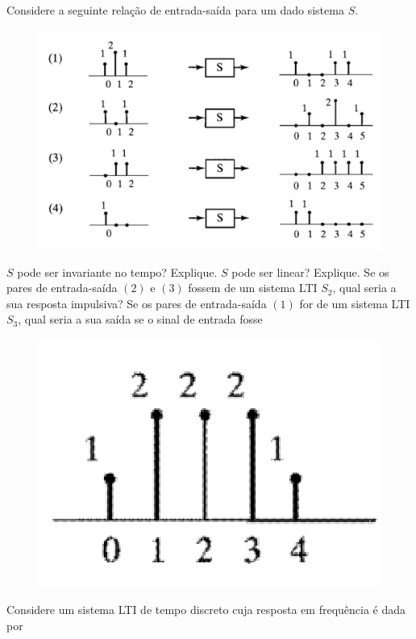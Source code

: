 \documentclass[12pt,a4paper]{article}
\begin{document}
\problem Considere a seguinte relação de entrada-saída para um dado sistema \(S\).
\begin{figure}[H]
    \centering
    \includegraphics[scale=0.12]{Fig/q5.png}
\end{figure}
\subproblem \(S\) pode ser invariante no tempo? Explique.
\subproblem \(S\) pode ser linear? Explique.
\subproblem Se os pares de entrada-saída \((2)\) e \((3)\) fossem de um sistema LTI \(S_2\), qual seria a sua resposta impulsiva?
\subproblem Se os pares de entrada-saída \((1)\) for de um sistema LTI \(S_3\), qual seria a sua saída se o sinal de entrada fosse
\begin{figure}[H]
    \centering
    \includegraphics[scale=0.2]{Fig/q5_d.png}
\end{figure}

\problem Considere um sistema LTI de tempo discreto cuja resposta em frequência é dada por
\end{document}
